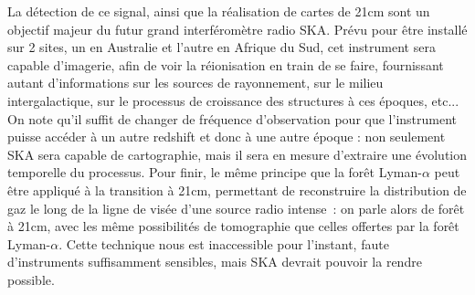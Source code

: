 La détection de ce signal, ainsi que la réalisation de cartes de 21cm sont un objectif majeur du futur grand interféromètre radio SKA. Prévu pour être installé sur 2 sites, un en Australie et l'autre en Afrique du Sud, cet instrument sera capable d'imagerie, afin de voir la réionisation en train de se faire, fournissant autant d'informations sur les sources de rayonnement, sur le milieu intergalactique, sur le processus de croissance des structures à ces époques, etc... On note qu'il suffit de changer de fréquence d'observation pour que l'instrument puisse accéder à un autre redshift et donc à une autre époque : non seulement SKA sera capable de cartographie, mais il sera en mesure d'extraire une évolution temporelle du processus. Pour finir, le même principe que la forêt Lyman-$\alpha$ peut être appliqué à la transition à 21cm, permettant de reconstruire la distribution de gaz le long de la ligne de visée d'une source radio intense~: on parle alors de forêt à 21cm, avec les même possibilités de tomographie que celles offertes par la forêt Lyman-$\alpha$. Cette technique nous est inaccessible pour l'instant, faute d'instruments suffisamment sensibles, mais SKA devrait pouvoir la rendre possible. 
 